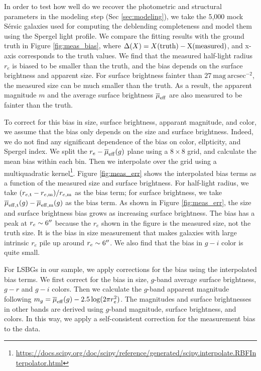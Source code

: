 \documentclass[twocolumn,astrosymb,twocolappendix]{aastex631}
\newcommand{\sbunit}{\mathrm{mag\ arcsec}^{-2}}
\newcommand{\sersic}{S\'ersic}
\begin{document}
\begin{CJK*}{UTF8}{gbsn}
In order to test how well do we recover the photometric and structural parameters in the modeling step (Sec \ref{sec:modeling}), we take the 5,000 mock \sersic{} galaxies used for computing the deblending completeness and model them using the Spergel light profile. We compare the fitting results with the ground truth in Figure \ref{fig:meas_bias}, where $\Delta(X) = X(\rm truth) - X(\rm measured)$, and x-axis corresponds to the truth values. We find that the measured half-light radius $r_e$ is biased to be smaller than the truth, and the bias depends on the surface brightness and apparent size. For surface brightness fainter than $27\ \sbunit$, the measured size can be much smaller than the truth. As a result, the apparent magnitude $m$ and the average surface brightness $\overline{\mu}_{\rm eff}$ are also measured to be fainter than the truth. 

To correct for this bias in size, surface brightness, apparant magnitude, and color, we assume that the bias only depends on the size and surface brightness. Indeed, we do not find any significant dependence of the bias on color, ellpticity, and Spergel index. We split the $r_e-\overline{\mu}_{\rm eff}(g)$ plane using a $8\times 8$ grid, and calculate the mean bias within each bin. Then we interpolate over the grid using a multiquadratic kernel\footnote{\url{https://docs.scipy.org/doc/scipy/reference/generated/scipy.interpolate.RBFInterpolator.html}}. Figure \ref{fig:meas_err} shows the interpolated bias terms as a function of the measured size and surface brightness. For half-light radius, we take $(r_{e, \rm t} - r_{e, \rm m}) / r_{e,\rm m}$ as the bias term; for surface brightness, we take $\overline{\mu}_{\rm eff, t}(g) - \overline{\mu}_{\rm eff, m}(g)$ as the bias term. As shown in Figure \ref{fig:meas_err}, the size and surface brightness bias grows as increasing surface brightness. The bias has a peak at $r_e\sim 6\mbox{$^{\prime\prime}$}$ because the $r_e$ shown in the figure is the measured size, not the truth size. It is the bias in size measurement that makes galaxies with large intrinsic $r_e$ pile up around $r_e\sim 6\mbox{$^{\prime\prime}$}$. We also find that the bias in $g-i$ color is quite small. 

For LSBGs in our sample, we apply corrections for the bias using the interpolated bias terms. We first correct for the bias in size, $g$-band average surface brightness, $g-r$ and $g-i$ colors. Then we calculate the $g$-band apparent magnitude following $m_g = \overline{\mu}_{\rm eff}(g) - 2.5\log(2\pi r_e^2)$. The magnitudes and surface brightnesses in other bands are derived using $g$-band magnitude, surface brightness, and colors. In this way, we apply a self-consistent correction for the measurement bias to the data. 


\end{CJK*}
\end{document}
